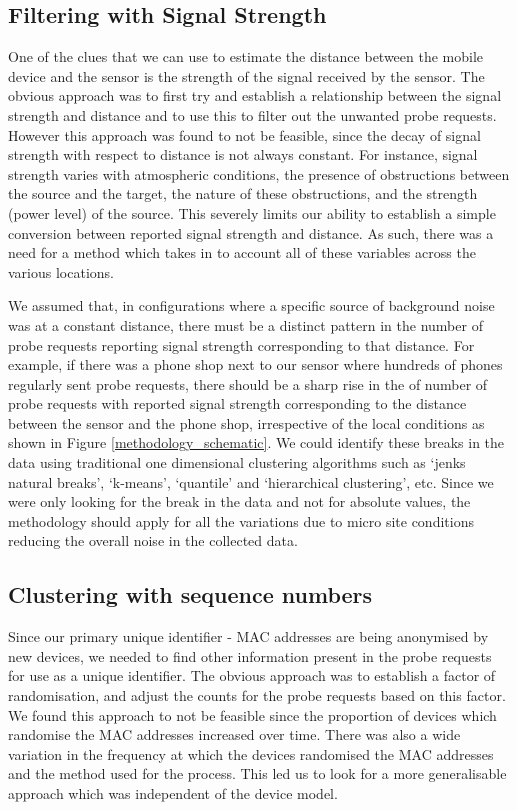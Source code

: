 \subsection{Filtering with Signal Strength} 

One of the clues that we can use to estimate the distance between the mobile
device and the sensor is the strength of the signal received by the sensor. The
obvious approach was to first try and establish a relationship between the
signal strength and distance and to use this to filter out the unwanted probe
requests. However this approach was found to not be feasible, since the decay of
signal strength with respect to distance is not always constant. For instance,
signal strength varies with atmospheric conditions, the presence of obstructions
between the source and the target, the nature of these obstructions, and the
strength (power level) of the source. This severely limits our ability to
establish a simple conversion between reported signal strength and distance. As
such, there was a need for a method which takes in to account all of these
variables across the various locations.

We assumed that, in configurations where a specific source of background noise
was at a constant distance, there must be a distinct pattern in the number of
probe requests reporting signal strength corresponding to that distance. For
example, if there was a phone shop next to our sensor where hundreds of phones
regularly sent probe requests, there should be a sharp rise in the of number of
probe requests with reported signal strength corresponding to the distance
between the sensor and the phone shop, irrespective of the local conditions as
shown in Figure \ref{methodology_schematic}. We could identify these breaks in
the data using traditional one dimensional clustering algorithms such as `jenks
natural breaks', `k-means', `quantile' and `hierarchical clustering', etc. Since
we were only looking for the break in the data and not for absolute values, the
methodology should apply for all the variations due to micro site conditions
reducing the overall noise in the collected data.

\subsection{Clustering with sequence numbers}

Since our primary unique identifier - MAC addresses are being anonymised by new
devices, we needed to find other information present in the probe requests for
use as a unique identifier. The obvious approach was to establish a factor of
randomisation, and adjust the counts for the probe requests based on this
factor. We found this approach to not be feasible since the proportion of
devices which randomise the MAC addresses increased over time. There was also a
wide variation in the frequency at which the devices randomised the MAC
addresses and the method used for the process. This led us to look for a more
generalisable approach which was independent of the device model.

